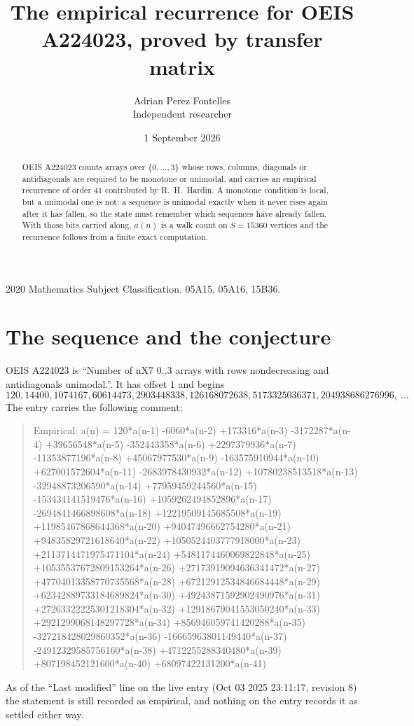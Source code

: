 \documentclass[11pt,a4paper]{article}
\title{The empirical recurrence for OEIS A224023, proved by transfer matrix}
\author{Adrian Perez Fontelles\\ \small Independent researcher}
\date{1 September 2026}
\theoremstyle{plain}
\theoremstyle{definition}
\begin{document}
\maketitle

\begin{abstract}
OEIS A224023 counts arrays over $\{0,\dots,3\}$ whose rows, columns, diagonals or
antidiagonals are required to be monotone or unimodal, and carries an empirical recurrence of
order $41$ contributed by R.~H.~Hardin. A monotone condition is local, but a unimodal one
is not: a sequence is unimodal exactly when it never rises again after it has fallen, so the
state must remember which sequences have already fallen. With those bits carried along, $a(n)$
is a walk count on $S=15360$ vertices and the recurrence follows from a finite exact
computation.
\end{abstract}

\noindent\small 2020 Mathematics Subject Classification. 05A15, 05A16, 15B36.\normalsize

\section{The sequence and the conjecture}

OEIS A224023 is ``Number of nX7 0..3 arrays with rows nondecreasing and antidiagonals unimodal.''. It has offset $1$ and begins
\[
120, 14400, 1074167, 60614473, 2903448338, 126168072638, 5173325036371, 204938686276996,\ \dots
\]
The entry carries the following comment:
\begin{quote}\small
Empirical: a(n) = 120*a(n-1) -6060*a(n-2) +173316*a(n-3) -3172287*a(n-4) +39656548*a(n-5) -352443358*a(n-6) +2297379936*a(n-7) -11353877196*a(n-8) +45067977530*a(n-9) -163575910944*a(n-10) +627001572604*a(n-11) -2683978430932*a(n-12) +10780238513518*a(n-13) -32948873206590*a(n-14) +77959459244560*a(n-15) -153434141519476*a(n-16) +1059262494852896*a(n-17) -2694841466898608*a(n-18) +12219509145685508*a(n-19) +11985467868644368*a(n-20) +94047496662754280*a(n-21) +94835829721618640*a(n-22) +1050524403777918000*a(n-23) +2113714471975471104*a(n-24) +5481174460069822848*a(n-25) +10535537672809153264*a(n-26) +27173919094636341472*a(n-27) +47704013358770735568*a(n-28) +67212912534846684448*a(n-29) +62342889733184689824*a(n-30) +49243871592902490976*a(n-31) +27263322225301218304*a(n-32) +12918679041553050240*a(n-33) +2921299068148297728*a(n-34) +856946059741420288*a(n-35) -327218428029860352*a(n-36) -16665963801149440*a(n-37) -24912329585756160*a(n-38) +4712255288340480*a(n-39) +807198452121600*a(n-40) +68097422131200*a(n-41)
\end{quote}
As of the ``Last modified'' line on the live entry (Oct 03 2025 23:11:17, revision 8) the statement is
still recorded as empirical, and nothing on the entry records it as settled either way.
\end{document}
